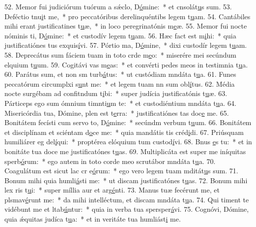 52. Memor fui judiciórum tuórum a sǽclo, D\uline{ó}mine:~* et cnsolát\uline{u}s sum.
53. Deféctio tnu\uline{i}t me,~* pro peccatóribus derelinquéntibs legem t\uline{u}am.
54. Cantábiles mihi erant justificatines t\uline{u}æ,~* in loco peregrinatónis m\uline{e}æ.
55. Memor fui nocte nóminis ti, D\uline{ó}mine:~* et custodív legem t\uline{u}am.
56. Hæc fact est m\uline{i}hi:~* quia justificatiónes tus exquis\uline{í}vi.
57. Pórtio ma, D\uline{ó}mine,~* dixi custodír legem t\uline{u}am.
58. Deprecátus sum fáciem tuam in toto crde m\uline{e}o:~* miserére mei secúndum elquium t\uline{u}um.
59. Cogitávi vas m\uline{e}as:~* et convérti pedes meos in testimnia t\uline{u}a.
60. Parátus sum, et non sm turb\uline{á}tus:~* ut custódiam mndáta t\uline{u}a.
61. Funes peccatórum circumplxi s\uline{u}nt me:~* et legem tuam nn sum obl\uline{í}tus.
62. Média nocte surgébam ad confitndum t\uline{i}bi:~* super judícia justificatónis t\uline{u}æ.
63. Párticeps ego sum ómnium timnti\uline{u}m te:~* et custodiéntium mndáta t\uline{u}a.
64. Misericórdia tua, Dómine, plen est t\uline{e}rra:~* justificatiónes tas doc\uline{e} me.
65. Bonitátem fecísti cum servo to, D\uline{ó}mine:~* secúndm verbum t\uline{u}um.
66. Bonitátem et disciplínam et sciéntam d\uline{o}ce me:~* quia mandátis tis créd\uline{i}di.
67. Priúsquam humiliárer eg del\uline{í}qui:~* proptérea elóquium tum custod\uline{í}vi.
68. Bnus \uline{e}s tu:~* et in bonitáte tua doce me justificatónes t\uline{u}as.
69. Multiplicáta est super me iníquitas sperb\uline{ó}rum:~* ego autem in toto corde meo scrutábor mndáta t\uline{u}a.
70. Coagulátum est sicut lac cr e\uline{ó}rum:~* ego vero legem tuam mditát\uline{u}s sum.
71. Bonum mihi quia humli\uline{á}sti me:~* ut discam justificatónes t\uline{u}as.
72. Bonum mihi lex ris t\uline{u}i:~* super míllia aur et arg\uline{é}nti.
73. Manus tuæ fecérunt me, et plsmav\uline{é}runt me:~* da mihi intelléctum, et discam mndáta t\uline{u}a.
74. Qui timent te vidébunt me et ltab\uline{ú}ntur:~* quia in verba tua spersper\uline{á}vi.
75. Cognóvi, Dómine, quia ǽquitas judíca t\uline{u}a:~* et in veritáte tua humliást\uline{i} me.
